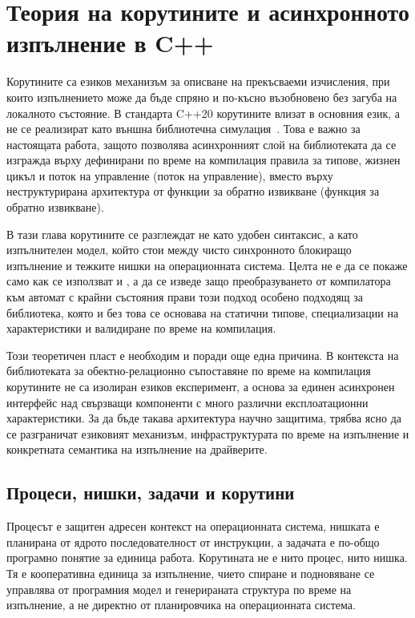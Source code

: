 \section{Теория на корутините и асинхронното изпълнение в C++}
\label{sec:coroutines_async_theory}

Корутините са езиков механизъм за описване на прекъсваеми изчисления, при които изпълнението може да бъде спряно и по-късно възобновено без загуба на локалното състояние. В стандарта C++20 корутините влизат в основния език, а не се реализират като външна библиотечна симулация~\cite{cpp20standard,p0912r5,p1063r0}. Това е важно за настоящата работа, защото позволява асинхронният слой на библиотеката да се изгражда върху дефинирани по време на компилация правила за типове, жизнен цикъл и поток на управление (поток на управление), вместо върху неструктурирана архитектура от функции за обратно извикване (функция за обратно извикване).

В тази глава корутините се разглеждат не като удобен синтаксис, а като изпълнителен модел, който стои между чисто синхронното блокиращо изпълнение и тежките нишки на операционната система. Целта не е да се покаже само как се използват  и , а да се изведе защо преобразуването от компилатора към автомат с крайни състояния прави този подход особено подходящ за библиотека, която и без това се основава на статични типове, специализации на характеристики и валидиране по време на компилация.

Този теоретичен пласт е необходим и поради още една причина. В контекста на библиотеката за обектно-релационно съпоставяне по време на компилация корутините не са изолиран езиков експеримент, а основа за единен асинхронен интерфейс над свързващи компоненти с много различни експлоатационни характеристики. За да бъде такава архитектура научно защитима, трябва ясно да се разграничат езиковият механизъм, инфраструктурата по време на изпълнение и конкретната семантика на изпълнение на драйверите.

\subsection{Процеси, нишки, задачи и корутини}

Процесът е защитен адресен контекст на операционната система, нишката е планирана от ядрото последователност от инструкции, а задачата е по-общо програмно понятие за единица работа. Корутината не е нито процес, нито нишка. Тя е кооперативна единица за изпълнение, чието спиране и подновяване се управлява от програмния модел и генерираната структура по време на изпълнение, а не директно от планировчика на операционната система.

